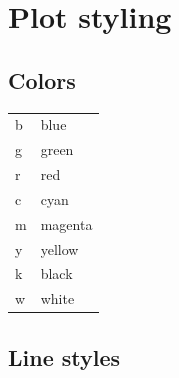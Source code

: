 \documentclass{article}
\begin{document}







\appendix
\newpage

\section{Plot styling}

\begin{multicols}{2}

    \subsection{Colors}

    \begin{tabular}{ l l }
    b & blue \\
    g & green \\
    r & red \\
    c & cyan \\
    m & magenta \\
    y & yellow \\
    k & black \\
    w & white \\
    \end{tabular}

\columnbreak

    \subsection{Line styles}


\end{multicols}
\end{document}
